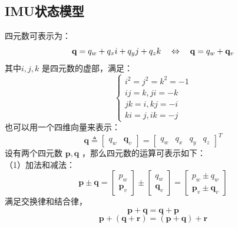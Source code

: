 \subsection{IMU状态模型}
四元数可表示为：
\begin{equation}
\setlength{\abovedisplayskip}{6pt}
\setlength{\belowdisplayskip}{6pt}
\label{eqn:2.16}
\mathbf{q}=q_{w}+q_{x} i+q_{y} j+q_{z} k \quad \Leftrightarrow \quad \mathbf{q}=q_{w}+\mathbf{q}_{v}
\end{equation}
其中$i,j,k$ 是四元数的虚部，满足：
\begin{equation}
\label{eqn:2.17}
\left\{\begin{array}{l}{i^{2}=j^{2}=k^{2}=-1} \\ {i j=k, j i=-k} \\ {j k=i, k j=-i} \\ {k i=j, i k=-j}\end{array}\right.
\end{equation}
也可以用一个四维向量来表示：
\begin{equation}
\label{eqn:2.18}
\mathbf{q} \triangleq \left[ \begin{array}{cc}
{q_{w}} & {\mathbf{q}_{v} }
\end{array}\right] = \left[ \begin{array}{cccc}
{q_{w}} & {q_{x}} & {q_{y}} & {q_{z} } \end{array}\right]^{T}
\end{equation}
设有两个四元数 $\mathbf{p}, \mathbf{q} $ ，那么四元数的运算可表示如下：\\
（1）加法和减法：
\begin{equation}
\label{eqn:2.19}
\mathbf{p} \pm \mathbf{q}=\left[ \begin{array}{c}{p_{w}} \\ {\mathbf{p}_{v}}\end{array}\right] \pm \left[ \begin{array}{c}{q_{w}} \\ {\mathbf{q}_{v}}\end{array}\right]=\left[ \begin{array}{c}{p_{w} \pm q_{w}} \\ {\mathbf{p}_{v} \pm \mathbf{q}_{v}}\end{array}\right]
\end{equation}
满足交换律和结合律，
\begin{equation}
\label{eqn:2.20}
\mathbf{p}+\mathbf{q}=\mathbf{q}+\mathbf{p}
\end{equation}
\begin{equation}
\label{eqn:2.21}
\mathbf{p}+(\mathbf{q}+\mathbf{r})=(\mathbf{p}+\mathbf{q})+\mathbf{r}
\end{equation}
